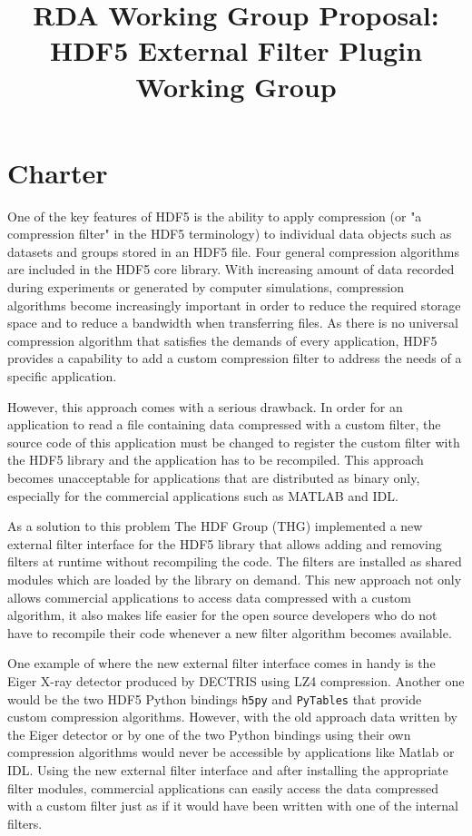 \documentclass{scrartcl}
\title{RDA Working Group Proposal:\\ HDF5 External Filter Plugin Working Group}
\begin{document}
\maketitle
\listoftodos

\section{Charter}

  One of the key features of HDF5 is the ability to apply compression (or "a compression filter" in the HDF5 terminology) to individual
data objects such as datasets and groups stored in an HDF5 file. Four general compression
algorithms are included in the HDF5 core library. 
With increasing amount of data recorded during experiments or generated by
computer simulations, compression algorithms  become increasingly important
in order to reduce the required storage space and to reduce a bandwidth when transferring files.
As there is no universal compression algorithm that satisfies the demands of
every application, HDF5 provides a capability to add a custom compression filter to address the needs of a specific application.
  
  However, this approach
comes with a serious drawback. In order for an application to read a file
containing data compressed with a custom filter, the source code of this
application must be changed to register the custom filter with the HDF5 library and
the application has to be recompiled. This approach becomes unacceptable for applications that are distributed as binary only, especially for the commercial applications such as MATLAB and IDL.

As a solution to this problem The HDF Group (THG) implemented a new external filter
interface for the HDF5 library that allows adding and removing filters at
runtime without recompiling the code. The filters are installed as shared
modules which are loaded by the library on demand. This new approach not only
allows commercial applications to access data compressed with a custom 
algorithm, it also makes life easier for the open source developers who do not
have to recompile their code whenever a new filter algorithm becomes available. 

One example of where the new external filter interface comes in handy is the
Eiger X-ray detector produced by DECTRIS using LZ4 compression. Another one
would be the two HDF5 Python bindings {\tt h5py} and {\tt PyTables} that provide
custom compression algorithms.
However, with the old approach data written by the Eiger detector or by one of
the two Python bindings using their own compression algorithms would never be
accessible by applications like Matlab or IDL.
Using the new external filter interface and after installing the appropriate
filter modules, commercial applications can easily access the data compressed with a custom filter just as if
it would have been written with one of the internal filters.
\end{document}
